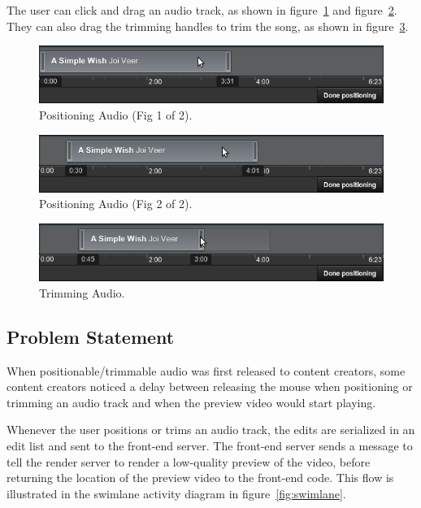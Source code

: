 \documentclass[se,resubmit]{uw-wkrpt}
\begin{document}
The user can click and drag an audio track, as shown in
figure~\ref{fig:position-drag-start} and
figure~\ref{fig:position-drag-end}. They can also drag the trimming handles
to trim the song, as shown in figure~\ref{fig:trim}.

\begin{figure}
  \centering
  \includegraphics[width=6.25in]{position-drag-start}
  \caption{Positioning Audio (Fig 1 of 2).}
  \label{fig:position-drag-start}
\end{figure}

\begin{figure}
  \centering
  \includegraphics[width=6.25in]{position-drag-end}
  \caption{Positioning Audio (Fig 2 of 2).}
  \label{fig:position-drag-end}
\end{figure}

\begin{figure}
  \centering
  \includegraphics[width=6.25in]{trim}
  \caption{Trimming Audio.}
  \label{fig:trim}
\end{figure}


\subsection{Problem Statement}\label{sec:problem}
When positionable/trimmable audio was first released to content creators,
some content creators noticed a delay between releasing the mouse when
positioning or trimming an audio track and when the preview video would
start playing.

Whenever the user positions or trims an audio track, the edits are
serialized in an edit list and sent to the front-end server. The front-end
server sends a message to tell the render server to render a low-quality
preview of the video, before returning the location of the preview video to
the front-end code. This flow is illustrated in the swimlane activity
diagram in figure~\ref{fig:swimlane}.
\end{document}
